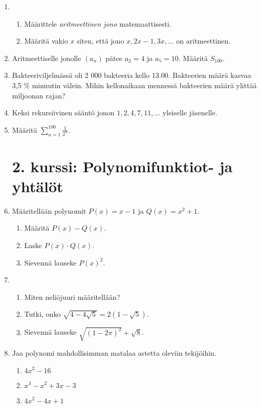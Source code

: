 \documentclass[12pt,fleqn]{article}
\begin{document}
\begin{enumerate}[label=\textbf{\arabic*.}]
\item 
\begin{enumerate}[label=\textbf{\alph*)}]
\item Määrittele \emph{aritmeettinen jono} matemaattisesti.
\item Määritä vakio \(x\) siten, että jono \(x, 2x-1, 3x, ...\) on aritmeettinen.
\end{enumerate}

\item Aritmeettiselle jonolle \((a_n)\) pätee \(a_2=4\) ja \(a_5=10\). Määritä \(S_{100}\).

\item Bakteeriviljelmässä oli 2 000 bakteeria kello 13.00. Bakteerien määrä kasvaa 3,5 \% minuutin välein. Mihin kellonaikaan mennessä bakteerien määrä ylittää miljoonan rajan?

\item Keksi rekursiivinen sääntö jonon \(1, 2, 4, 7, 11, ...\) yleiselle jäsenelle.

\item Määritä \(\displaystyle \sum_{n=1}^{100} {\frac{1}{2^n}}.\)
\newpage
\section*{2. kurssi: Polynomifunktiot- ja yhtälöt}

\item Määritellään polynomit \(P(x)=x-1\) ja \(Q(x)=x^2+1\).
\begin{enumerate}[label=\textbf{\alph*)}]
\item Määritä \(P(x)-Q(x)\).
\item Laske \(P(x)\cdot Q(x)\).
\item Sievennä lauseke \(P(x)^2\).
\end{enumerate}

\item 
\begin{enumerate}[label=\textbf{\alph*)}]
\item Miten neliöjuuri määritellään?
\item Tutki, onko \(\sqrt{4-4\sqrt{5}}=2(1-\sqrt{5})\).
\item Sievennä lauseke \(\sqrt{(1-2\pi)^2}+\sqrt{8}\).
\end{enumerate}

\item Jaa polynomi mahdollisimman matalaa astetta oleviin tekijöihin.
\begin{enumerate}[label=\textbf{\alph*)}]
\item \(4x^2-16\)
\item \(x^3-x^2+3x-3\)
\item \(4x^2-4x+1\)
\end{enumerate}


\end{enumerate}
\end{document}
